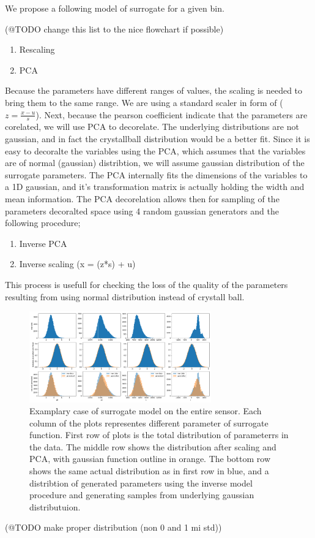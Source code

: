 We propose a following model of surrogate for a given bin.

(@TODO change this list to the nice flowchart if possible)
\begin{enumerate}
  \item Rescaling
  \item PCA
\end{enumerate}

Because the parameters have different ranges of values, the scaling is needed to bring them to the same range. We are using a standard scaler in form of ($z = \frac{x - u}{s}$).
Next, because the pearson coefficient indicate that the parameters are corelated, we will use PCA to decorelate.
The underlying distributions are not gaussian, and in fact the crystallball distribution would be a better fit.
Since it is easy to decoralte the variables using the PCA, which assumes that the variables are of normal (gaussian) distribtion, we will assume gaussian distribution of the surrogate parameters.
The PCA internally fits the dimensions of the variables to a 1D gaussian, and it's transformation matrix is actually holding the width and mean information.
The PCA decorelation allows then for sampling of the parameters decoralted space using 4 random gaussian generators and the following procedure;

\begin{enumerate}
\item Inverse PCA
\item Inverse scaling (x = (z*s) + u)
\end{enumerate}

This process is usefull for checking the loss of the quality of the parameters resulting from using normal distribution instead of crystall ball.

\begin{figure}[H]
\centering
\includegraphics[width=0.7\textwidth]{figures/chapter4/surrogates/p3_model_pipe.png}
\caption{Examplary case of surrogate model on the entire sensor.
  Each column of the plots representes different parameter of surrogate function. First row of plots is the total distribution of parameterrs in the data.
  The middle row shows the distribution after scaling and PCA, with gaussian function outline in orange.
  The bottom row shows the same actual distribution as in first row in blue, and a distribtion of generated parameters using the inverse model procedure and generating samples from underlying gaussian distributuion.
}
\label{fig:surrogate_model_total}
\end{figure}
(@TODO make proper distribution (non 0 and 1 mi std))

